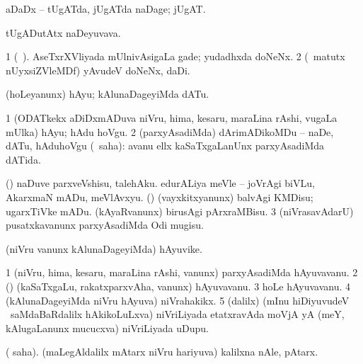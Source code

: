 \bentry
{} 
\gl{\nA}
\expl{}
\bmng
aDaDx -- tUgATda, jUgATda naDage; jUgAT. 
\emng
\eentry

\bentry
{} 
\gl{\nA}
\bmng
tUgADutAtx naDeyuvava. 
\emng
\eentry

\bentry
{} 
\gl{\nA}
\bmng
\bnum
\num{1} (\bava\ ). AseTxrXVliyada mUlnivAsigaLa gade; yudadhxda doNeNx. 
\num{2} (\AseTxrXV\ matutx nUyxsiZVleMDf) yAvudeV doNeNx, daDi. 
\enum
\emng
\eentry

\bentry
{} 
\gl{\sakirx}
\expl{}
\bmng
(hoLeyanunx) hAyu; kAlunaDageyiMda dATu. 
\emng

\noindent 
\gl{\akirx}
\expl{}
\bmng
\bnum
\num{1} (ODATkekx aDiDxmADuva niVru, hima, kesaru, maraLina rAshi, \mo vugaLa mUlka) hAyu; hAdu hoVgu. 
\num{2} (parxyAsadiMda) dArimADikoMDu -- naDe, dATu, hAduhoVgu (\rUpa\ saha):  avanu ellx kaSaTxgaLanUnx parxyAsadiMda dATida. 
\enum
\emng

\noindent
\gl{\pagu}
\expl{}
\bmng
\bnum
{}  (\AmA) 
\banum
{} naDuve parxveVshisu, talehAku. 
 edurALiya meVle -- joVrAgi biVLu, AkarxmaN mADu, meVlAvxyu. 
\eanum
\numie
{}  (\AmA) 
\banum
{} (vayxkitxyanunx) balvAgi KMDisu; ugarxTiVke mADu. 
 (kAyaRvanunx) birusAgi pArxraMBisu. 
\eanum
\numie
\num{3}  (niVrasavAdarU) pusatxkavanunx parxyAsadiMda Odi mugisu. 
\enum
\emng
\eentry

\bentry
{} 
\gl{\nA}
\expl{}
\bmng
(niVru \mo vanunx kAlunaDageyiMda) hAyuvike. 
\emng
\eentry

\bentry
{} 
\gl{\gu}
\expl{}
\bmng
{} 
\emng
\eentry

\bentry
{} 
\gl{\nA}
\bmng
\bnum
\num{1} (niVru, hima, kesaru, maraLina rAshi, \mo vanunx) parxyAsadiMda hAyuvavanu. 
\num{2} (\rUpa) (kaSaTxgaLu, rakatxparxvAha, \mo vanunx) hAyuvavanu. 
\num{3} hoLe hAyuvavanu. 
\num{4} (kAlunaDageyiMda niVru hAyuva) niVrahakikx. 
\num{5} (\bava dalilx) (mInu hiDiyuvudeV \mo\ saMdaBaRdalilx hAkikoLuLxva) niVriLiyada etatxravAda moVjA yA (meY, kAlugaLanunx mucucxva) niVriLiyada uDupu. 
\enum
\emng
\eentry

\bentry
{} 
\gl{\nA}
\bmng
( saha). (maLegAldalilx mAtarx niVru hariyuva) kalilxna nAle, pAtarx. 
\emng
\eentry


